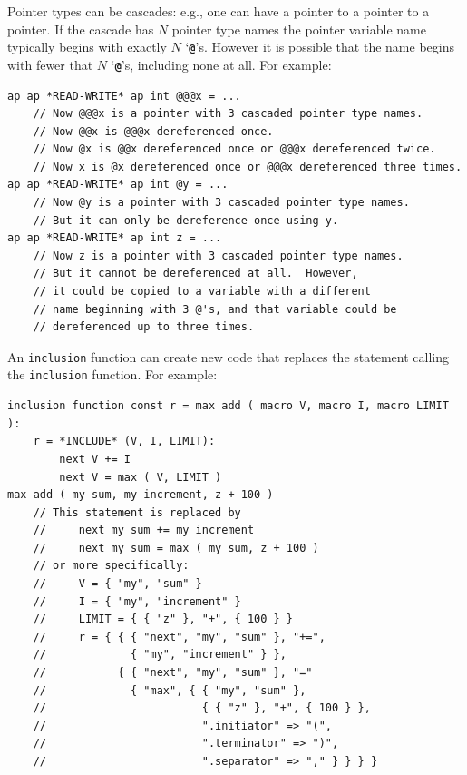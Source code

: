 \documentclass[12pt]{article}
\newcommand{\TT}[1]{{\tt \bfseries #1}}
\newenvironment{indpar}[1][0.3in]%
	{\begin{list}{}%
		     {\setlength{\itemsep}{0in}%
		      \setlength{\topsep}{0in}%
		      \setlength{\parsep}{1ex}%
		      \setlength{\labelwidth}{#1}%
		      \setlength{\leftmargin}{#1}%
		      \addtolength{\leftmargin}{\labelsep}}%
	 \item}%
	{\end{list}}
\begin{document}
Pointer types can be cascades: e.g., one can have a pointer to a pointer
to a pointer.  If the cascade has $N$ pointer type names the pointer
variable name typically begins with exactly $N$ `\TT{@}'s.  However
it is possible that the name begins with fewer that $N$ `\TT{@}'s,
including none at all.  For example:\label{POINTER-DEREFERENCE-EXAMPLE}
\begin{indpar}\begin{verbatim}
ap ap *READ-WRITE* ap int @@@x = ...
    // Now @@@x is a pointer with 3 cascaded pointer type names.
    // Now @@x is @@@x dereferenced once.
    // Now @x is @@x dereferenced once or @@@x dereferenced twice.
    // Now x is @x dereferenced once or @@@x dereferenced three times.
ap ap *READ-WRITE* ap int @y = ...
    // Now @y is a pointer with 3 cascaded pointer type names.
    // But it can only be dereference once using y.
ap ap *READ-WRITE* ap int z = ...
    // Now z is a pointer with 3 cascaded pointer type names.
    // But it cannot be dereferenced at all.  However,
    // it could be copied to a variable with a different
    // name beginning with 3 @'s, and that variable could be
    // dereferenced up to three times.
\end{verbatim}\end{indpar}


An {\tt inclusion} function can create new code that replaces
the statement calling the {\tt inclu\-sion} function.  For example:
\begin{indpar}[0.1in]\begin{verbatim}
inclusion function const r = max add ( macro V, macro I, macro LIMIT ):
    r = *INCLUDE* (V, I, LIMIT):
        next V += I
        next V = max ( V, LIMIT )
max add ( my sum, my increment, z + 100 )
    // This statement is replaced by
    //     next my sum += my increment
    //     next my sum = max ( my sum, z + 100 )
    // or more specifically:
    //     V = { "my", "sum" }
    //     I = { "my", "increment" }
    //     LIMIT = { { "z" }, "+", { 100 } }
    //     r = { { { "next", "my", "sum" }, "+=",
    //             { "my", "increment" } },
    //           { { "next", "my", "sum" }, "="
    //             { "max", { { "my", "sum" },
    //                        { { "z" }, "+", { 100 } },
    //                        ".initiator" => "(",
    //                        ".terminator" => ")",
    //                        ".separator" => "," } } } }
\end{verbatim}\end{indpar}
\end{document}
